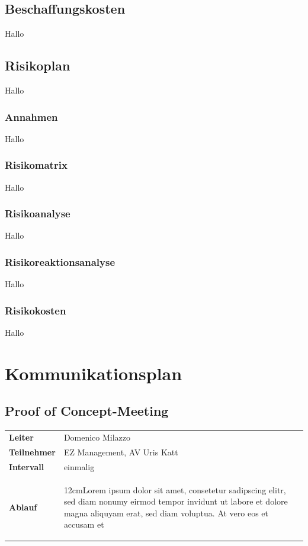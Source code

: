 \documentclass[a4paper,10pt]{scrartcl}
\newcommand\Absatz[2][12cm]{\begin{varwidth}{#1}\flushleft#2\end{varwidth}}
\begin{document}
\subsection{Beschaffungskosten}
Hallo

\subsection{Risikoplan}
Hallo

\subsubsection{Annahmen}
Hallo

\subsubsection{Risikomatrix}
Hallo

\subsubsection{Risikoanalyse}
Hallo

\subsubsection{Risikoreaktionsanalyse}
Hallo

\subsubsection{Risikokosten}
Hallo

\newpage

\section{Kommunikationsplan}
\subsection{Proof of Concept-Meeting}
\begin{tabular}{ll} 
\toprule
\textbf{Leiter} & Domenico Milazzo\\
\textbf{Teilnehmer}  & EZ Management, AV Uris Katt\\
\midrule 
\textbf{Intervall}  & einmalig\\
\midrule 
\textbf{Ablauf}  & {\Absatz{Lorem ipsum dolor sit amet, consetetur sadipscing elitr, sed diam nonumy eirmod tempor invidunt ut labore et dolore magna aliquyam erat, sed diam voluptua. At vero eos et accusam et \linebreak}}\\
\bottomrule
\end{tabular}
\vspace{5mm}
\end{document}

